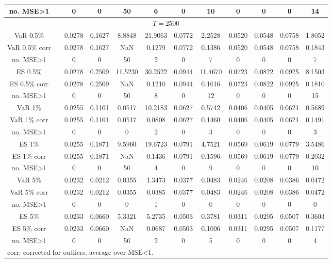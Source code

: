 {\begin{sidewaystable}
\begin{tabular}{cc cc cccc cccc}
no. MSE>1 && 0 & 0 & 50 & 6 & 0 & 10 &0 & 0 & 0 & 14 \\[1ex] 
\hline 
\multicolumn{12}{c}{$T =2500$}  \\ 
\hline 
VaR 0.5\% && 0.0278 & 0.1627 & 8.8848 & 21.9063 & 0.0772 & 2.2528 &0.0520 & 0.0548 & 0.0758 & 1.8052 \\ 
VaR 0.5\% corr && 0.0278 & 0.1627 &    NaN & 0.1279 & 0.0772 & 0.1386 &0.0520 & 0.0548 & 0.0758 & 0.1843 \\ 
no. MSE>1 && 0 & 0 & 50 & 2 & 0 & 7 &0 & 0 & 0 & 7 \\[1ex] 
ES 0.5\% && 0.0278 & 0.2509 & 11.5230 & 30.2522 & 0.0944 & 11.4670 &0.0723 & 0.0822 & 0.0925 & 8.1503 \\ 
ES 0.5\% corr && 0.0278 & 0.2509 &    NaN & 0.1210 & 0.0944 & 0.1616 &0.0723 & 0.0822 & 0.0925 & 0.1810 \\ 
no. MSE>1 && 0 & 0 & 50 & 8 & 0 & 12 &0 & 0 & 0 & 15 \\[1.5ex] 
VaR 1\% && 0.0255 & 0.1101 & 0.0517 & 10.2183 & 0.0627 & 0.5742 &0.0406 & 0.0405 & 0.0621 & 0.5689 \\ 
VaR 1\% corr && 0.0255 & 0.1101 & 0.0517 & 0.0808 & 0.0627 & 0.1460 &0.0406 & 0.0405 & 0.0621 & 0.1491 \\ 
no. MSE>1 && 0 & 0 & 0 & 2 & 0 & 3 &0 & 0 & 0 & 3 \\[1ex] 
ES 1\% && 0.0255 & 0.1871 & 9.5960 & 19.6723 & 0.0791 & 4.7521 &0.0569 & 0.0619 & 0.0779 & 3.5486 \\ 
ES 1\% corr && 0.0255 & 0.1871 &    NaN & 0.1436 & 0.0791 & 0.1596 &0.0569 & 0.0619 & 0.0779 & 0.2032 \\ 
no. MSE>1 && 0 & 0 & 50 & 4 & 0 & 9 &0 & 0 & 0 & 10 \\[1.5ex] 
VaR 5\% && 0.0232 & 0.0212 & 0.0355 & 1.3473 & 0.0377 & 0.0483 &0.0246 & 0.0208 & 0.0386 & 0.0472 \\ 
VaR 5\% corr && 0.0232 & 0.0212 & 0.0355 & 0.0385 & 0.0377 & 0.0483 &0.0246 & 0.0208 & 0.0386 & 0.0472 \\ 
no. MSE>1 && 0 & 0 & 0 & 1 & 0 & 0 &0 & 0 & 0 & 0 \\[1ex] 
ES 5\% && 0.0233 & 0.0660 & 5.3321 & 5.2735 & 0.0503 & 0.3781 &0.0311 & 0.0295 & 0.0507 & 0.3603 \\ 
ES 5\% corr && 0.0233 & 0.0660 &    NaN & 0.0687 & 0.0503 & 0.1006 &0.0311 & 0.0295 & 0.0507 & 0.1177 \\ 
no. MSE>1 && 0 & 0 & 50 & 2 & 0 & 5 &0 & 0 & 0 & 4 \\[1ex] 
\hline 
\multicolumn{12}{l}{\footnotesize{corr: corrected for outliers, average over MSE<1.}}  \\ 

\end{tabular}
\end{sidewaystable}}
